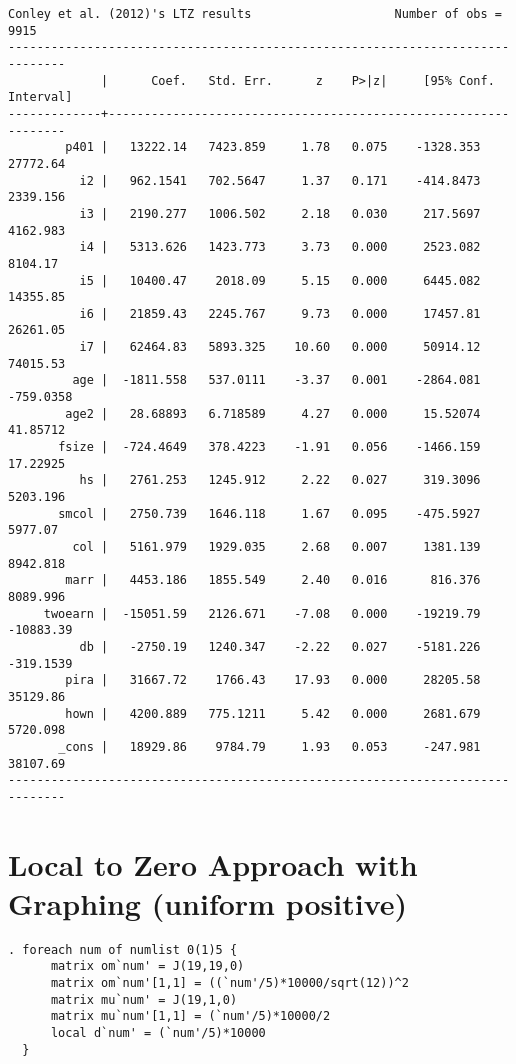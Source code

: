 \documentclass{article}[11pt] %
\begin{document}
\begin{spacing}{1}
\begin{verbatim}
Conley et al. (2012)'s LTZ results                    Number of obs =      9915
------------------------------------------------------------------------------
             |      Coef.   Std. Err.      z    P>|z|     [95% Conf. Interval]
-------------+----------------------------------------------------------------
        p401 |   13222.14   7423.859     1.78   0.075    -1328.353    27772.64
          i2 |   962.1541   702.5647     1.37   0.171    -414.8473    2339.156
          i3 |   2190.277   1006.502     2.18   0.030     217.5697    4162.983
          i4 |   5313.626   1423.773     3.73   0.000     2523.082     8104.17
          i5 |   10400.47    2018.09     5.15   0.000     6445.082    14355.85
          i6 |   21859.43   2245.767     9.73   0.000     17457.81    26261.05
          i7 |   62464.83   5893.325    10.60   0.000     50914.12    74015.53
         age |  -1811.558   537.0111    -3.37   0.001    -2864.081   -759.0358
        age2 |   28.68893   6.718589     4.27   0.000     15.52074    41.85712
       fsize |  -724.4649   378.4223    -1.91   0.056    -1466.159    17.22925
          hs |   2761.253   1245.912     2.22   0.027     319.3096    5203.196
       smcol |   2750.739   1646.118     1.67   0.095    -475.5927     5977.07
         col |   5161.979   1929.035     2.68   0.007     1381.139    8942.818
        marr |   4453.186   1855.549     2.40   0.016      816.376    8089.996
     twoearn |  -15051.59   2126.671    -7.08   0.000    -19219.79   -10883.39
          db |   -2750.19   1240.347    -2.22   0.027    -5181.226   -319.1539
        pira |   31667.72    1766.43    17.93   0.000     28205.58    35129.86
        hown |   4200.889   775.1211     5.42   0.000     2681.679    5720.098
       _cons |   18929.86    9784.79     1.93   0.053     -247.981    38107.69
------------------------------------------------------------------------------

\end{verbatim}


\section{Local to Zero Approach with Graphing (uniform positive)}
\begin{verbatim}
. foreach num of numlist 0(1)5 {
      matrix om`num' = J(19,19,0)
      matrix om`num'[1,1] = ((`num'/5)*10000/sqrt(12))^2
      matrix mu`num' = J(19,1,0)
      matrix mu`num'[1,1] = (`num'/5)*10000/2
      local d`num' = (`num'/5)*10000
  }


\end{verbatim}
\end{spacing}
\end{document}
